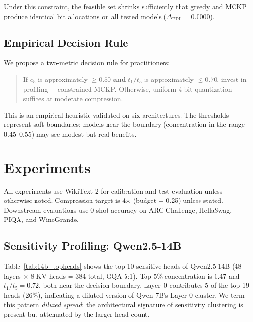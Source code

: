 \documentclass[11pt,a4paper]{article}
\newcommand{\topkconc}{\ensuremath{c_5}}
\newcommand{\tratio}{\ensuremath{t_1/t_5}}
\begin{document}
Under this constraint, the feasible set shrinks sufficiently that greedy and MCKP produce identical bit allocations on all tested models ($\Delta_{\text{PPL}} = 0.0000$).

\subsection{Empirical Decision Rule}

We propose a two-metric decision rule for practitioners:
\begin{quote}
    If \topkconc{} is approximately $\ge 0.50$ \textbf{and} \tratio{} is approximately $\le 0.70$, invest in profiling + constrained MCKP.
    Otherwise, uniform 4-bit quantization suffices at moderate compression.
\end{quote}
This is an empirical heuristic validated on six architectures.
The thresholds represent soft boundaries: models near the boundary (concentration in the range 0.45--0.55) may see modest but real benefits.

\section{Experiments}

All experiments use WikiText-2 for calibration and test evaluation unless otherwise noted.
Compression target is 4$\times$ (budget = 0.25) unless stated.
Downstream evaluations use 0-shot accuracy on ARC-Challenge, HellaSwag, PIQA, and WinoGrande.

\subsection{Sensitivity Profiling: Qwen2.5-14B}
\label{sec:profiling_14b}

Table~\ref{tab:14b_topheads} shows the top-10 sensitive heads of Qwen2.5-14B (48 layers $\times$ 8 KV heads = 384 total, GQA 5:1).
Top-5\% concentration is 0.47 and $\tratio = 0.72$, both near the decision boundary.
Layer~0 contributes 5 of the top 19 heads (26\%), indicating a diluted version of Qwen-7B's Layer-0 cluster.
We term this pattern \emph{diluted spread}: the architectural signature of sensitivity clustering is present but attenuated by the larger head count.
\end{document}
